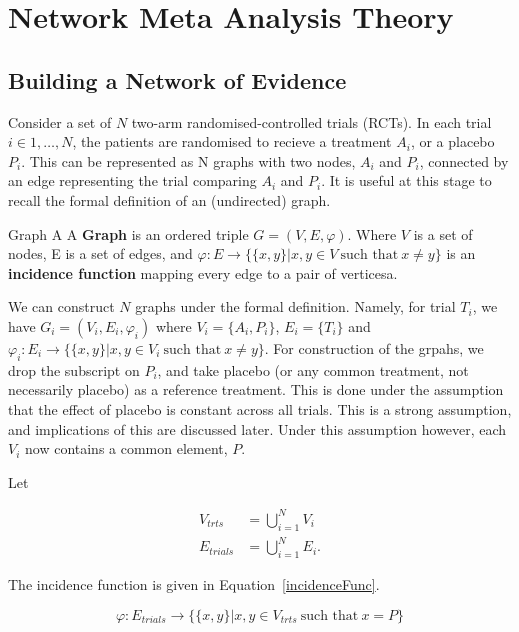 \chapter{Network Meta Analysis Theory}\label{nmatheory}

\section{Building a Network of Evidence}

Consider a set of $N$ two-arm randomised-controlled trials (RCTs). In each trial $i \in 1,\ldots,N$, the patients are randomised to recieve a treatment $A_i$, or a placebo $P_i$. This can be represented as N graphs with two nodes, $A_i$ and $P_i$, connected by an edge representing the trial comparing $A_i$ and $P_i$. It is useful at this stage to recall the formal definition of an (undirected) graph. 

\begin{definition}{Graph}
A  A \textbf{Graph} is an ordered triple $G = (V, E, \varphi)$. Where  $V$ is a set of nodes, E is a set  of edges, and $\varphi : E \to \{\{ x, y \} | x, y \in V \ \text{such that} \ x \neq y \}$ is an  \textbf{incidence function} mapping every edge to a pair of verticesa.
\end{definition}

We can construct $N$ graphs under the formal definition. Namely, for trial $T_i$, we have $G_i = (V_i, E_i, \varphi_i)$ where $V_i = \{ A_i, P_i \}$, $E_i = \{T_i\}$ and $\varphi_i : E_i \to \{ \{ x, y \} | x, y \in V_i \ \text{such that} \  x \neq y \}$. For construction of the grpahs, we drop the subscript on $P_i$, and take placebo (or any common treatment, not necessarily placebo) as a reference treatment. This is done under the assumption that the effect of placebo is constant across all trials. This is a strong assumption, and implications of this are discussed later. Under this assumption however, each $V_i$ now contains a common element, $P$.

Let

\begin{align*}
    V_{trts} &= \bigcup_{i=1}^{N} V_i \\
    E_{trials} &= \bigcup_{i=1}^{N} E_i
.\end{align*}

The incidence function is given in Equation~\ref{incidenceFunc}.

\begin{equation}
    \varphi : E_{trials} \to \{ \{x, y \} | x, y \in V_{trts} \ \text{such that} \ x = P \}
    \label{incidenceFunc}
\end{equation}

